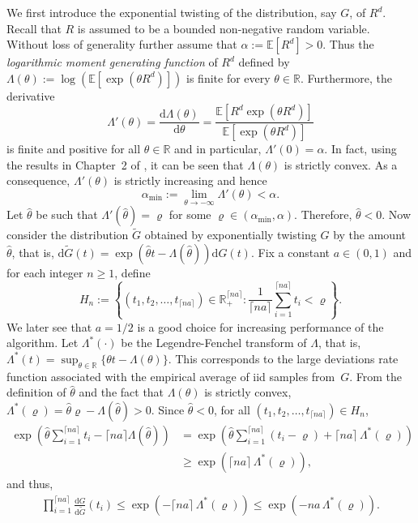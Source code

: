 \documentclass[11pt]{article}
\newcommand{\dd}{\mathrm{d}}
\newcommand{\ee}{\mathbb{E}}
\newcommand{\reals}{\mathbb{R}}
\newcommand{\lt}{\left}
\newcommand{\rt}{\right}
\newcommand{\wt}{\widetilde}
\newcommand{\wh}{\widehat}
\begin{document}
We first introduce the exponential twisting of the distribution, say $G$, of $R^d$. Recall that $R$ is assumed to be a bounded non-negative random variable. Without loss of generality further assume that ${\alpha := \ee[R^d] > 0}$. 
Thus the {\it logarithmic moment generating function} of $R^d$ defined  by 
${\Lambda(\theta) := \log\lt(\ee\lt[\exp({\theta R^d}) \rt] \rt)}$ is finite for every $\theta \in \reals$. 
Furthermore, the derivative 
\[
\Lambda'(\theta) = \frac{\dd \Lambda(\theta)}{\dd \theta} = \frac{\ee\lt[R^d\exp({\theta R^d}) \rt] }{\ee\lt[\exp({\theta R^d}) \rt]}
\]
is finite and positive for all $\theta \in \reals$ and in particular, ${\Lambda'(0) = \alpha}$. In fact, using the results in Chapter~2 of \cite{DZ10}, it can be seen that 
$\Lambda(\theta)$ is strictly convex. As a consequence, $\Lambda'(\theta)$ is strictly increasing and hence
\[
\alpha_{\min} := \lim_{\theta \to -\infty} \Lambda'(\theta) < \alpha.
\]
Let $\wh \theta$ be such that 
${\Lambda'(\wh \theta) = \varrho}$ for some ${\varrho \in (\alpha_{\min}, \alpha)}$. 
Therefore, ${\wh \theta < 0}$. Now consider the distribution  $\wt G$ obtained by  exponentially twisting $G$ by the amount $\wh \theta$, that is, 
${\dd \wt G(t)} = \exp\lt( \wh \theta t - \Lambda(\wh \theta)\rt)\dd G(t).$
Fix a constant $a \in (0,1)$ and for each integer $n \geq 1$, define
\[
 H_n := \lt\{ (t_1, t_2, \dots, t_{\lceil n a \rceil}) \in \reals_+^{\lceil n a \rceil}: \frac{1}{\lceil n a \rceil}\sum_{i= 1}^{\lceil n a \rceil} t_i < \varrho \rt\}.
\]
We later  see that $a = 1/2$ is a good choice for increasing performance of the algorithm.
Let $\Lambda^*(\cdot)$ be the Legendre-Fenchel transform of $\Lambda$, that is, ${\Lambda^*(t) = \sup_{\theta \in \reals} \{\theta t -  \Lambda(\theta)\}}$. {This corresponds} to the large deviations rate function
associated with the empirical average of iid samples from~$G$. 
From the definition of $\wh \theta$ and the fact that $\Lambda(\theta)$ is strictly convex, {${\Lambda^*(\varrho) = \wh \theta  \varrho - \Lambda(\wh \theta) >0}$}. 
Since $\wh \theta < 0$, {for all ${(t_1, t_2, \dots, t_{\lceil n a \rceil}) \in H_n}$},
\begin{align*}
\exp\lt( \wh \theta \sum_{i=1}^{\lceil n a \rceil} t_i - \lceil n a \rceil \Lambda(\wh \theta)\rt)  &= \exp\lt( \wh \theta \sum_{i=1}^{\lceil n a \rceil} (t_i - \varrho) + \lceil n a \rceil\, \Lambda^*(\varrho)\rt)\\ &\geq \exp\lt( \lceil n a \rceil\, \Lambda^*(\varrho)\rt),
\end{align*}
and  thus,
\begin{align}
\label{eqn:LHRatio_ET}
 \prod_{i=1}^{\lceil n a \rceil} \frac{ \dd G}{\dd \wt G}( t_i) \leq \exp\lt( - \lceil n a \rceil\, \Lambda^*(\varrho)\rt) \leq \exp\lt( - n a \, \Lambda^*(\varrho)\rt).
\end{align}
\end{document}
